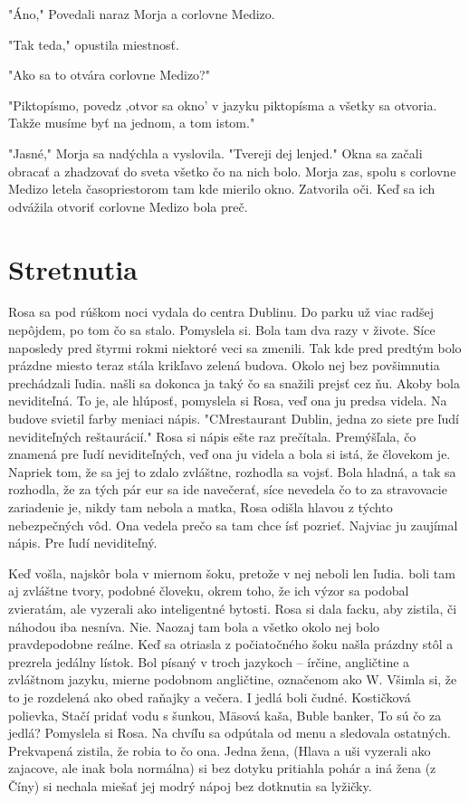 \documentclass{book}
\begin{document}
"$ $Áno,"$ $ Povedali naraz Morja a corlovne Medizo.

"$ $Tak teda,"$ $ opustila miestnosť.

"$ $Ako sa to otvára corlovne Medizo?"

"$ $Piktopísmo, povedz ‚otvor sa okno' v jazyku piktopísma a všetky sa otvoria. Takže musíme byť na jednom, a tom istom."

"$ $Jasné,"$ $ Morja sa nadýchla a vyslovila. "$ $Tvereji dej lenjed."$ $ Okna sa začali obracať a zhadzovať do sveta všetko čo na nich bolo. Morja zas, spolu s corlovne Medizo letela časopriestorom tam kde mierilo okno. Zatvorila oči. Keď sa ich odvážila otvoriť corlovne Medizo bola preč.

\chapter{Stretnutia}

Rosa sa pod rúškom noci vydala do centra Dublinu. Do parku už viac radšej nepôjdem, po tom čo sa stalo. Pomyslela si. Bola tam dva razy v živote. Síce naposledy pred štyrmi rokmi niektoré veci sa zmenili. Tak kde pred predtým bolo prázdne miesto teraz stála krikľavo zelená budova. Okolo nej bez povšimnutia prechádzali ľudia. našli sa dokonca ja taký čo sa snažili prejsť cez ňu. Akoby bola neviditeľná. To je, ale hlúposť, pomyslela si Rosa, veď ona ju predsa videla. Na budove svietil farby meniaci nápis. "$ $CMrestaurant Dublin, jedna zo siete pre ľudí neviditeľných reštaurácií."$ $ Rosa si nápis ešte raz prečítala. Premýšľala, čo znamená pre ľudí neviditeľných, veď ona ju videla a bola si istá, že človekom je. Napriek tom, že sa jej to zdalo zvláštne, rozhodla sa vojsť. Bola hladná, a tak sa rozhodla, že za tých pár eur sa ide navečerať, síce nevedela čo to za stravovacie zariadenie je, nikdy tam nebola a matka, Rosa odišla hlavou z týchto nebezpečných vôd. Ona vedela prečo sa tam chce ísť pozrieť. Najviac ju zaujímal nápis. Pre ľudí neviditeľný.

Keď vošla, najskôr bola v miernom šoku, pretože v nej neboli len ľudia. boli tam aj zvláštne tvory, podobné človeku, okrem toho, že ich výzor sa podobal zvieratám, ale vyzerali ako inteligentné bytosti. Rosa si dala facku, aby zistila, či náhodou iba nesníva. Nie. Naozaj tam bola a všetko okolo nej bolo pravdepodobne reálne. Keď sa otriasla z počiatočného šoku našla prázdny stôl a prezrela jedálny lístok. Bol písaný v troch jazykoch – írčine, angličtine a zvláštnom jazyku, mierne podobnom angličtine, označenom ako W. Všimla si, že to je rozdelená ako obed raňajky a večera. I jedlá boli čudné. Kostičková polievka, Stačí pridať vodu s šunkou, Mäsová kaša, Buble banker, To sú čo za jedlá? Pomyslela si Rosa. Na chvíľu sa odpútala od menu a sledovala ostatných. Prekvapená zistila, že robia to čo ona. Jedna žena, (Hlava a uši vyzerali ako zajacove, ale inak bola normálna) si bez dotyku pritiahla pohár a iná žena (z Číny) si nechala miešať jej modrý nápoj bez dotknutia sa lyžičky.
\end{document}
